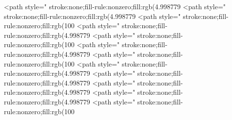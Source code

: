 <path style=" stroke:none;fill-rule:nonzero;fill:rgb(4.998779%
<path style=" stroke:none;fill-rule:nonzero;fill:rgb(4.998779%
<path style=" stroke:none;fill-rule:nonzero;fill:rgb(100%
<path style=" stroke:none;fill-rule:nonzero;fill:rgb(4.998779%
<path style=" stroke:none;fill-rule:nonzero;fill:rgb(100%
<path style=" stroke:none;fill-rule:nonzero;fill:rgb(4.998779%
<path style=" stroke:none;fill-rule:nonzero;fill:rgb(100%
<path style=" stroke:none;fill-rule:nonzero;fill:rgb(4.998779%
<path style=" stroke:none;fill-rule:nonzero;fill:rgb(4.998779%
<path style=" stroke:none;fill-rule:nonzero;fill:rgb(4.998779%
<path style=" stroke:none;fill-rule:nonzero;fill:rgb(4.998779%
<path style=" stroke:none;fill-rule:nonzero;fill:rgb(100%
